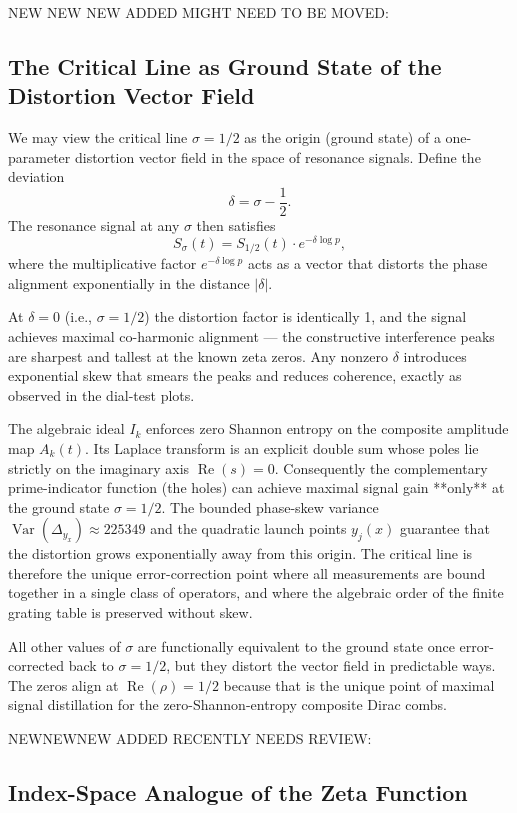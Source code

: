 \documentclass[11pt,a4paper]{article}
\begin{document}
NEW NEW NEW ADDED MIGHT NEED TO BE MOVED:
\subsection{The Critical Line as Ground State of the Distortion Vector Field}

We may view the critical line \(\sigma=1/2\) as the origin (ground state) of a one-parameter distortion vector field in the space of resonance signals. Define the deviation
\[
\delta = \sigma - \frac12.
\]
The resonance signal at any \(\sigma\) then satisfies
\[
S_\sigma(t) = S_{1/2}(t) \cdot e^{-\delta \log p},
\]
where the multiplicative factor \(e^{-\delta \log p}\) acts as a vector that distorts the phase alignment exponentially in the distance \(|\delta|\).

At \(\delta=0\) (i.e., \(\sigma=1/2\)) the distortion factor is identically 1, and the signal achieves maximal co-harmonic alignment — the constructive interference peaks are sharpest and tallest at the known zeta zeros. Any nonzero \(\delta\) introduces exponential skew that smears the peaks and reduces coherence, exactly as observed in the dial-test plots.

The algebraic ideal \(I_k\) enforces zero Shannon entropy on the composite amplitude map \(A_k(t)\). Its Laplace transform is an explicit double sum whose poles lie strictly on the imaginary axis \(\operatorname{Re}(s)=0\). Consequently the complementary prime-indicator function (the holes) can achieve maximal signal gain **only** at the ground state \(\sigma=1/2\). The bounded phase-skew variance \(\operatorname{Var}(\Delta_{y_x})\approx225349\) and the quadratic launch points \(y_j(x)\) guarantee that the distortion grows exponentially away from this origin. The critical line is therefore the unique error-correction point where all measurements are bound together in a single class of operators, and where the algebraic order of the finite grating table is preserved without skew.

All other values of \(\sigma\) are functionally equivalent to the ground state once error-corrected back to \(\sigma=1/2\), but they distort the vector field in predictable ways. The zeros align at \(\operatorname{Re}(\rho)=1/2\) because that is the unique point of maximal signal distillation for the zero-Shannon-entropy composite Dirac combs.



NEWNEWNEW ADDED RECENTLY NEEDS REVIEW:

\subsection{Index-Space Analogue of the Zeta Function}
\end{document}
